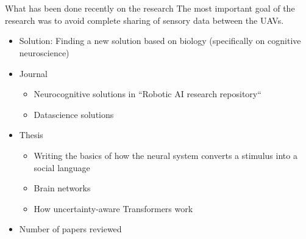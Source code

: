 \section{}
    \begin{frame}[allowframebreaks]{What has been done recently on the research}
        The most important goal of the research was to avoid complete sharing of sensory data between the UAVs.
        \begin{itemize}
            \item Solution: Finding a new solution based on biology (specifically on cognitive neuroscience)
        \end{itemize}
        \begin{itemize}
            \item Journal
            \begin{itemize}
                \item Neurocognitive solutions in ``Robotic AI research repository`` 
                \item Datascience solutions 
            \end{itemize}
            \item Thesis
            \begin{itemize}
                \item Writing the basics of how the neural system converts a stimulus into a social language
                \item Brain networks
                \item How uncertainty-aware Transformers work
            \end{itemize}
        \end{itemize}
    \end{frame}

    \begin{itemize}
        \item Number of papers reviewed
    \end{itemize}

    \subsection{}
        
        
